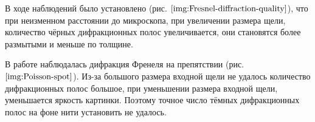 В ходе наблюдений было установлено (рис. $\ref{img:Fresnel-diffraction-quality}$), что при неизменном расстоянии до микроскопа, при увеличении размера щели, количество чёрных дифракционных полос увеличивается, они становятся более размытыми и меньше по толщине.

В работе наблюдалась дифракция Френеля на препятствии (рис. $\ref{img:Poisson-spot}$). Из-за большого размера входной щели не удалось количество дифракционных полос большое, при уменьшении размера входной щели, уменьшается яркость картинки. Поэтому точное число тёмных дифракционных полос на фоне нити установить не удалось.

